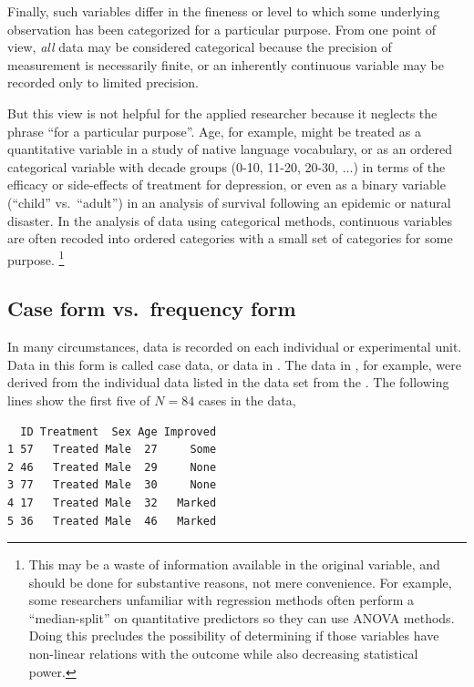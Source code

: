 \documentclass[10pt,krantz2]{krantz}\usepackage[]{graphicx}\usepackage[]{color}
\makeatletter
\newenvironment{kframe}{%
 \def\at@end@of@kframe{}%
 \ifinner\ifhmode%
  \def\at@end@of@kframe{\end{minipage}}%
  \begin{minipage}{\columnwidth}%
 \fi\fi%
 \def\FrameCommand##1{\hskip\@totalleftmargin \hskip-\fboxsep
 \colorbox{shadecolor}{##1}\hskip-\fboxsep
     \hskip-\linewidth \hskip-\@totalleftmargin \hskip\columnwidth}%
 \MakeFramed {\advance\hsize-\width
   \@totalleftmargin\z@ \linewidth\hsize
   \@setminipage}}%
 {\par\unskip\endMakeFramed%
 \at@end@of@kframe}
\newenvironment{knitrout}{}{} %
\renewenvironment{knitrout}{\small\renewcommand{\baselinestretch}{.85}}{} %
\makeatother
\begin{document}
Finally, such variables differ in the
fineness or level to which some underlying observation has been
categorized for a particular purpose.
From one point of view, \emph{all} data
may be considered categorical because the precision of measurement
is necessarily finite, or an inherently continuous variable may be recorded only to limited precision.

But this view is not helpful for the applied
researcher because it neglects the phrase ``for a particular purpose''.
Age, for example, might be treated as a quantitative variable in a study of native language vocabulary, or as an ordered categorical variable
with decade groups (0-10, 11-20, 20-30, $\dots$)
in terms of
the efficacy or side-effects of treatment for depression, or even as a
binary variable (``child'' vs.\  ``adult'') in an analysis of survival following an epidemic or natural disaster. In the analysis of
data using categorical methods, continuous variables are often recoded
into ordered categories with a small set of categories for some purpose.%
\footnote{
This may be a waste of information available in the original
variable, and should be done for substantive reasons, not mere
convenience.  For example, some researchers unfamiliar with
regression methods often perform a ``median-split'' on
quantitative predictors
so they can use ANOVA methods. Doing this precludes the possibility
of determining if those variables have non-linear relations with
the outcome while also decreasing statistical power.
}

\subsection{Case form vs.\ frequency form}\label{sec:case-freq}
In many circumstances, data is recorded on each individual or experimental
unit.  Data in this form is called case data,
or data in .
The data in , for example, were derived from
the individual data listed in the data set 
from the .  The following lines show the first
five  of $N=84$ cases in the  data,
\begin{knitrout}
\color{fgcolor}\begin{kframe}
\begin{verbatim}
  ID Treatment  Sex Age Improved
1 57   Treated Male  27     Some
2 46   Treated Male  29     None
3 77   Treated Male  30     None
4 17   Treated Male  32   Marked
5 36   Treated Male  46   Marked
\end{verbatim}
\end{kframe}
\end{knitrout}
\end{document}
